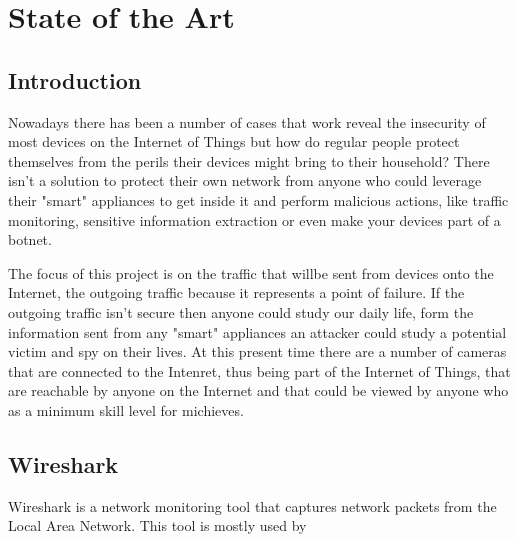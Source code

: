 \chapter{State of the Art}
\label{chap:state-of-art}

\section{Introduction}
\label{chap2:sec:intro}
Nowadays there has been a number of cases that work reveal the insecurity of
most devices on the Internet of Things %
but how do regular people protect themselves from the perils their devices
might bring to their household? There isn't a solution to protect their own
network from anyone who could leverage their "smart" appliances to get inside
it and perform malicious actions, like traffic monitoring, sensitive
information extraction or even make your devices part of a botnet.

The focus of this project is on the traffic that willbe sent from devices onto
the Internet, the outgoing traffic because it represents a point of failure.
If the outgoing traffic isn't secure then anyone could study our daily life,
form the information sent from any "smart" appliances an attacker could study
a potential victim and spy on their lives. At this present time there are a
number of cameras that are connected to the Intenret, thus being part of the
Internet of Things, that are reachable by anyone on the Internet and that
could be viewed by anyone who as a minimum skill level for michieves.

\section{Wireshark}
\label{chap2:sec:wire}
Wireshark is a network monitoring tool that captures network packets from the
Local Area Network. This tool is mostly used by
